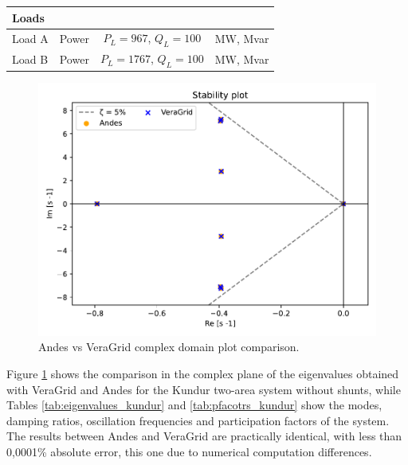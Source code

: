 \begin{table}[H]
\begin{tabular}{llcl}
\multicolumn{4}{l}{\textbf{Loads}} \\ 
\hline
Load A & Power & $P_L = 967$, $Q_L = 100$ & MW, Mvar \\ 
Load B & Power & $P_L = 1767$, $Q_L = 100$ & MW, Mvar \\ 
\hline

\end{tabular}
\end{table}

\begin{figure}[H]
  \centering
  \includegraphics[width=0.8\linewidth]{inkscape_svg/andes_vs_veragrid_kundur.pdf}
  \caption{Andes vs VeraGrid complex domain plot comparison.}
  \label{fig:AndesvsVeraGrid}
\end{figure}


Figure \ref{fig:AndesvsVeraGrid} shows the comparison in the complex plane of the eigenvalues obtained
with VeraGrid and Andes for the Kundur two-area system without shunts, while Tables \ref{tab:eigenvalues_kundur} and
\ref{tab:pfacotrs_kundur} show the modes, damping ratios, oscillation frequencies and participation factors of the system.
The results between Andes and VeraGrid are practically identical, 
with less than 0,0001\% absolute error, this one due to numerical computation differences.





